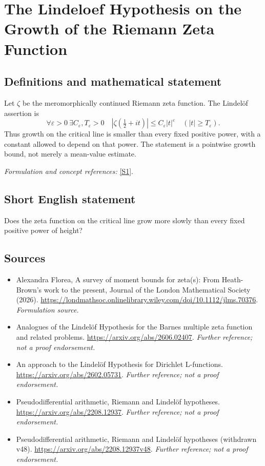 \documentclass[11pt]{article}
\begin{document}
\section*{\texorpdfstring{The Lindeloef Hypothesis on the Growth of the Riemann Zeta Function}{The Lindeloef Hypothesis on the Growth of the Riemann Zeta Function}}\label{81}
\subsection{Definitions and mathematical statement}
Let $\zeta$ be the meromorphically continued Riemann zeta function. The Lindelöf assertion is
\[
 \forall\varepsilon>0\ \exists C_\varepsilon,T_\varepsilon>0\quad
 |\zeta(\tfrac12+it)|\le C_\varepsilon|t|^\varepsilon
 \quad(|t|\ge T_\varepsilon).
\]
Thus growth on the critical line is smaller than every fixed positive power, with a constant allowed to depend on that power. The statement is a pointwise growth bound, not merely a mean-value estimate.
\par\smallskip\textit{Formulation and concept references:} \href{https://londmathsoc.onlinelibrary.wiley.com/doi/10.1112/jlms.70376}{[S1]}.

\subsection{Short English statement}
Does the zeta function on the critical line grow more slowly than every fixed positive power of height?
\subsection{Sources}
\begin{itemize}
\item[S1]Alexandra Florea, A survey of moment bounds for zeta(s): From Heath-Brown's work to the present, Journal of the London Mathematical Society (2026).
\url{https://londmathsoc.onlinelibrary.wiley.com/doi/10.1112/jlms.70376}.
\textit{Formulation source.}
\item[S2]Analogues of the Lindelöf Hypothesis for the Barnes multiple zeta function and related problems.
\url{https://arxiv.org/abs/2606.02407}.
\textit{Further reference; not a proof endorsement.}
\item[S3]An approach to the Lindelöf Hypothesis for Dirichlet L-functions.
\url{https://arxiv.org/abs/2602.05731}.
\textit{Further reference; not a proof endorsement.}
\item[S4]Pseudodifferential arithmetic, Riemann and Lindelöf hypotheses.
\url{https://arxiv.org/abs/2208.12937}.
\textit{Further reference; not a proof endorsement.}
\item[S5]Pseudodifferential arithmetic, Riemann and Lindelöf hypotheses (withdrawn v48).
\url{https://arxiv.org/abs/2208.12937v48}.
\textit{Further reference; not a proof endorsement.}
\end{itemize}
\end{document}
